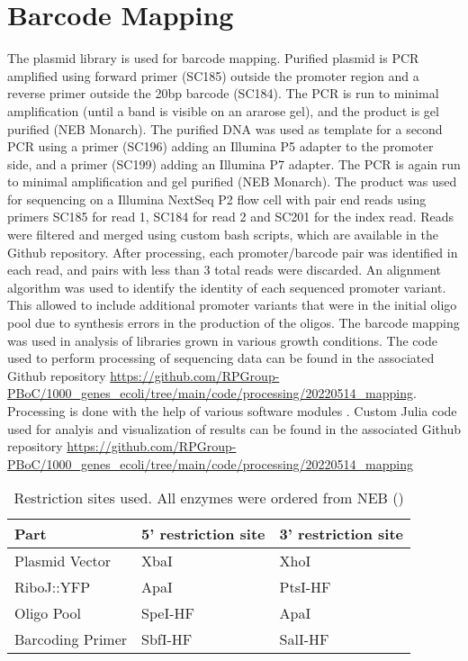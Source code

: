 \section{Barcode Mapping}
\label{sec:barcode_mapping}
The plasmid library is used for barcode mapping. Purified plasmid is PCR amplified using forward primer (SC185) outside the promoter region and a reverse primer outside the 20bp barcode (SC184). The PCR is run to minimal amplification (until a band is visible on an ararose gel), and the product is gel purified (NEB Monarch). The purified DNA was used as template for a second PCR using a primer (SC196) adding an Illumina P5 adapter to the promoter side, and a primer (SC199) adding an Illumina P7 adapter. The PCR is again run to minimal amplification and gel purified (NEB Monarch). The product was used for sequencing on a Illumina NextSeq P2 flow cell with pair end reads using primers SC185 for read 1, SC184 for read 2 and SC201 for the index read. Reads were filtered and merged using custom bash scripts, which are available in the Github repository. After processing, each promoter/barcode pair was identified in each read, and pairs with less than 3 total reads were discarded. An alignment algorithm was used to identify the identity of each sequenced promoter variant. This allowed to include additional promoter variants that were in the initial oligo pool due to synthesis errors in the production of the oligos. The barcode mapping was used in analysis of libraries grown in various growth conditions. The code used to perform processing of sequencing data can be found in the associated Github repository \url{https://github.com/RPGroup-PBoC/1000_genes_ecoli/tree/main/code/processing/20220514_mapping}. Processing is done with the help of various software modules \cite{bushnell2014bbmap, chen2018fastp, tange_2023_7761866}. Custom Julia code used for analyis and visualization of results can be found in the associated Github repository \url{https://github.com/RPGroup-PBoC/1000_genes_ecoli/tree/main/code/processing/20220514_mapping}

  

\begin{table}[]
\centering
\begin{tabular}{|l|l|l|}
\hline
Part             & 5' restriction site & 3' restriction site \\ \hline
Plasmid Vector   & XbaI                & XhoI                \\ \hline
RiboJ::YFP       & ApaI                & PtsI-HF               \\ \hline
Oligo Pool       & SpeI-HF               & ApaI                \\ \hline
Barcoding Primer & SbfI-HF                & SalI-HF                \\ \hline
\end{tabular}
\caption{Restriction sites used. All enzymes were ordered from NEB ()}
\label{tab:re_sites}
\end{table}

